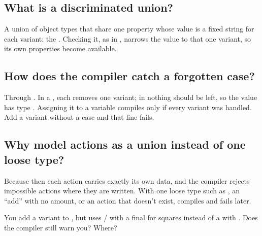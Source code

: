 \label{ch:c21}

\subsection{What is a discriminated union?}%
A union of object types that share one property whose value is a fixed string for each variant: the . Checking it, as in , narrows the value to that one variant, so its own properties become available.

\subsection{How does the compiler catch a forgotten case?}%
Through . In a , each  removes one variant; in  nothing should be left, so the value has type . Assigning it to a  variable compiles only if every variant was handled. Add a variant without a case and that line fails.

\subsection{Why model actions as a union instead of one loose type?}%
Because then each action carries exactly its own data, and the compiler rejects impossible actions where they are written. With one loose type such as , an ``add'' with no amount, or an action that doesn't exist, compiles and fails later.

\begin{ponder}You add a  variant to , but  uses / with a final  for squares instead of a  with . Does the compiler still warn you? Where?\end{ponder}
